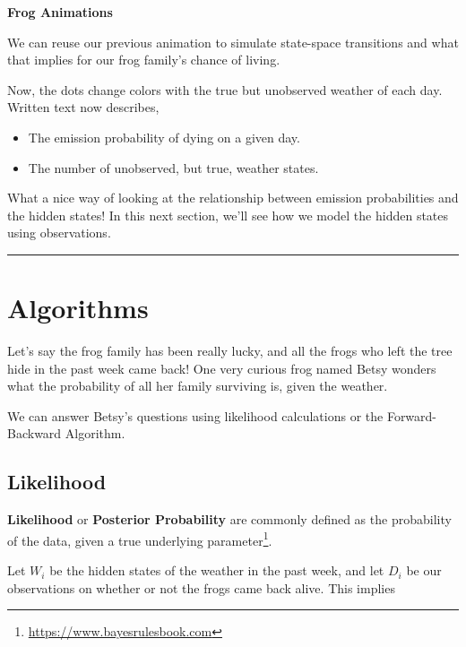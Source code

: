 \documentclass[
]{book}
\providecommand{\tightlist}{%
  \setlength{\itemsep}{0pt}\setlength{\parskip}{0pt}}
\begin{document}
\hfill\break

\textbf{Frog Animations}

We can reuse our previous animation to simulate state-space transitions and what that implies for our frog family's chance of living.

Now, the dots change colors with the true but unobserved weather of each day. Written text now describes,

\begin{itemize}
\tightlist
\item
  The emission probability of dying on a given day.
\item
  The number of unobserved, but true, weather states.
\end{itemize}

What a nice way of looking at the relationship between emission probabilities and the hidden states! In this next section, we'll see how we model the hidden states using observations.

\hfill\break

\begin{center}\rule{0.5\linewidth}{0.5pt}\end{center}

\hypertarget{algorithms}{%
\section{Algorithms}\label{algorithms}}

Let's say the frog family has been really lucky, and all the frogs who left the tree hide in the past week came back! One very curious frog named Betsy wonders what the probability of all her family surviving is, given the weather.

We can answer Betsy's questions using likelihood calculations or the Forward-Backward Algorithm.

\hypertarget{likelihood}{%
\subsection*{Likelihood}\label{likelihood}}

\textbf{Likelihood} or \textbf{Posterior Probability} are commonly defined as the probability of the data, given a true underlying parameter\footnote{\url{https://www.bayesrulesbook.com}}.

Let \(W_i\) be the hidden states of the weather in the past week, and let \(D_i\) be our observations on whether or not the frogs came back alive. This implies
\end{document}
